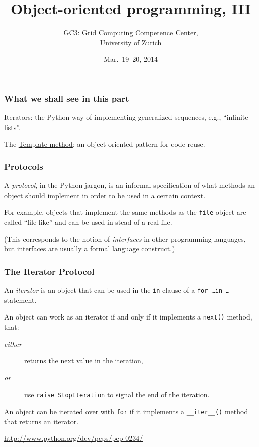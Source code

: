 \documentclass[english,serif,mathserif,xcolor=pdftex,dvipsnames,table]{beamer}
\title[OOP 2]{%
  Object-oriented programming, III
}
\author[GC3]{%
  GC3: Grid Computing Competence Center, \\
  University of Zurich
}
\date{Mar.~19--20, 2014}
\begin{document}
\maketitle


\begin{frame}
  \frametitle{What we shall see in this part}

  Iterators: the Python way of implementing generalized sequences,
  e.g., ``infinite lists''.

  \+
  The \href{http://en.wikipedia.org/wiki/Template_method_pattern}{Template
    method}: an object-oriented pattern for code reuse.
\end{frame}


\begin{frame}
  \frametitle{Protocols}
  A \emph{protocol}, in the Python jargon, is an informal
  specification of what methods an object should implement in order to
  be used in a certain context.

  \+ For example, objects that implement the same methods as the
  \texttt{file} object are called ``file-like'' and can be used in
  stead of a real file.

  \+
  (This corresponds to the notion of \emph{interfaces} in other
  programming languages, but interfaces are usually a formal language
  construct.)
\end{frame}


\begin{frame}[fragile]
  \frametitle{The Iterator Protocol}

  An \emph{iterator} is an object that can be used in the
  \texttt{in}-clause of a \texttt{for \ldots in \ldots} statement.

  \+
  An object can work as an iterator if and only if it implements a
  \texttt{next()} method, that:
  \begin{description}
  \item[\emph{either}] returns the next value in the iteration,
  \item[\emph{or}] use \lstinline|raise StopIteration| to signal the
    end of the iteration.
  \end{description}

  \+
  An object can be iterated over with \lstinline|for| if it implements a
  \lstinline|__iter__()| method that returns an iterator.

  \begin{references}
    \url{http://www.python.org/dev/peps/pep-0234/}
  \end{references}
\end{frame}
\end{document}
